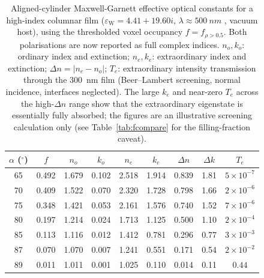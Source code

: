 \documentclass[aip,amsmath,amssymb,reprint]{revtex4-1}
\newcommand{\dang}{\ensuremath{\alpha}}
\begin{document}
\begin{table}[htbp]
  \centering
  \caption{%
    Aligned-cylinder Maxwell-Garnett effective optical constants
    \citep{maxwell1904} for a high-index columnar film
    ($\varepsilon_{\mathrm{W}} = 4.41 + 19.60i$, $\lambda \approx \SI{500}{nm}$
    \citep{palik1985}, vacuum host), using the thresholded voxel occupancy
    $f = f_{\rho>0.5}$.  Both polarisations are now reported as full complex
    indices.  $n_o,k_o$: ordinary index and extinction; $n_e,k_e$:
    extraordinary index and extinction; $\Delta n=|n_e-n_o|$;
    $T_e$: extraordinary intensity transmission through the \SI{300}{nm}
    film (Beer--Lambert screening, normal incidence, interfaces neglected).
    The large $k_e$ and near-zero $T_e$ across the high-$\Delta n$ range show
    that the extraordinary eigenstate is essentially fully absorbed; the
    figures are an illustrative screening calculation only
    (see Table~\ref{tab:fcompare} for the filling-fraction caveat).
  }
  \label{tab:mg}
  \footnotesize
  \begin{tabular}{ccccccccc}
    \toprule
    $\dang$ ($^{\circ}$) & $f$ & $n_o$ & $k_o$ & $n_e$ & $k_e$ & $\Delta n$ & $\Delta k$ & $T_e$ \\
    \midrule
    65 & 0.492 & 1.679 & 0.102 & 2.518 & 1.914 & 0.839 & 1.81 & $5\times10^{-7}$ \\
    70 & 0.409 & 1.522 & 0.070 & 2.320 & 1.728 & 0.798 & 1.66 & $2\times10^{-6}$ \\
    75 & 0.348 & 1.421 & 0.053 & 2.161 & 1.576 & 0.740 & 1.52 & $7\times10^{-6}$ \\
    80 & 0.197 & 1.214 & 0.024 & 1.713 & 1.125 & 0.500 & 1.10 & $2\times10^{-4}$ \\
    85 & 0.113 & 1.116 & 0.012 & 1.412 & 0.781 & 0.296 & 0.77 & $3\times10^{-3}$ \\
    87 & 0.070 & 1.070 & 0.007 & 1.241 & 0.551 & 0.171 & 0.54 & $2\times10^{-2}$ \\
    89 & 0.011 & 1.011 & 0.001 & 1.025 & 0.110 & 0.014 & 0.11 & $0.44$ \\
    \bottomrule
  \end{tabular}
\end{table}
\end{document}
